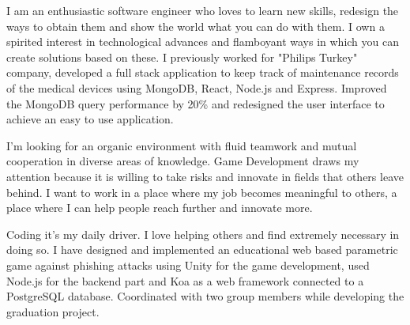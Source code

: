 \documentclass[11pt, a4paper]{awesome-cv}
\begin{document}
\makecvheader

\makelettertitle

\begin{cvletter}
I am an enthusiastic software engineer who loves to learn new skills, redesign the ways to obtain them and show the world what you can do with them. I own a spirited interest in technological advances and flamboyant ways in which you can create solutions based on these. I previously worked for "Philips Turkey" company, developed a full stack application to keep track of maintenance records of the medical devices using MongoDB, React, Node.js and Express.
Improved the MongoDB query performance by 20\% and redesigned the user interface to achieve an easy to use application.

I'm looking for an organic environment with fluid teamwork and mutual cooperation in diverse areas of knowledge. Game Development draws my attention because it is willing to take risks and innovate in fields that others leave behind. I want to work in a place where my job becomes meaningful to others, a place where I can help people reach further and innovate more.

 Coding it's my daily driver. I love helping others and find extremely necessary in doing so. I have designed and implemented an educational web based parametric game against phishing attacks using Unity for the game development, used Node.js for the backend part and Koa as a web framework connected to a PostgreSQL database. Coordinated with two group members while developing the graduation project.
 
\end{cvletter}

\makeletterclosing
\end{document}
